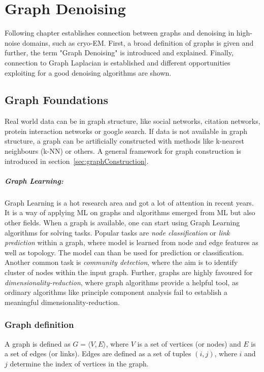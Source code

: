 \chapter{Graph Denoising}
\label{sec:graphDenoising}
    

Following chapter establishes connection between graphs and denoising in high-noise 
domains, such as cryo-EM.
First, a broad definition of graphs is given and further, the term "Graph Denoising" is
introduced and explained. Finally, connection to Graph Laplacian is established
and different opportunities exploiting for a good denoising algorithms are shown.


\section{Graph Foundations}
Real world data can be in graph structure, like social networks, citation networks,
protein interaction networks or google search. 
If data is not available in graph structure, a graph can be artificially constructed with methods like k-nearest neighbours (k-NN) or others.
A general framework for graph construction is introduced in section~\ref{sec:graphConstruction}.

\paragraph{Graph Learning:} Graph Learning is a hot research area and got a lot of attention in recent years.
It is a way of applying ML on graphs and algorithms emerged from ML but also other fields.
When a graph is available, one can start using Graph Learning algorithms for solving tasks.
Popular tasks are \textit{node classification} or \textit{link prediction} within a graph, where model is learned from node and edge features 
as well as topology. The model can than be used for prediction or classification.
Another common task is \textit{community detection}, where the aim is to identify cluster of nodes within the input graph.
Further, graphs are highly favoured for \textit{dimensionality-reduction}, where 
graph algorithms provide a helpful tool, as ordinary algorithms like principle component analysis fail to 
establish a meaningful dimensionality-reduction.

\subsection{Graph definition}
A graph is defined as $G = \langle V,E \rangle$, where $V$ is a set of 
vertices (or nodes) and $E$ is a set of edges (or links). 
Edges are defined as a set of tuples $(i, j)$, where $i$ and $j$ determine 
the index of vertices in the graph.

